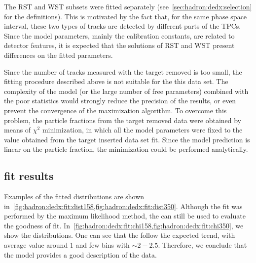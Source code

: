 The RST and WST subsets were fitted
separately (see~\cref{sec:hadron:dedx:selection} for the definitions).
This is motivated by the fact that, for the same phase space
interval, these two types of tracks are detected by
different parts of the TPCs. Since the model parameters,
mainly the calibration constants, are related to
detector features, it is expected that the solutions
of RST and WST present differences on the fitted
parameters.

Since the number of tracks measured with the target removed is
too small, the fitting procedure described above is not suitable for the
this data set. The complexity of the model
(or the large number of free parameters) combined with
the poor statistics would strongly reduce the precision of
the results, or even prevent the convergence of the maximization
algorithm. To overcome this problem, the particle fractions
from the target removed data were obtained by means of
$\chi^2$ minimization, in which all the model parameters
were fixed to the value obtained from the target inserted
data set fit. Since the model prediction is linear on
the particle fraction, the minimization could be performed
analytically. 

\subsection{\boldmath \dedx fit results}
\label{sec:hadron:dedx:fitresults}

Examples of the fitted \dedx distributions are shown
in~\cref{fig:hadron:dedx:fit:dist158,fig:hadron:dedx:fit:dist350}.
Although the fit was performed by the maximum likelihood method,
the \redchisq can still be used to evaluate the goodness of fit.
In~\cref{fig:hadron:dedx:fit:chi158,fig:hadron:dedx:fit:chi350},
we show the \redchisq distributions.
One can see that the \redchisq follow the expected trend,
with average value around 1 and few bins with \redchisq$\sim2-2.5$.
Therefore, we conclude that the \dedx model
provides a good description of the data.

